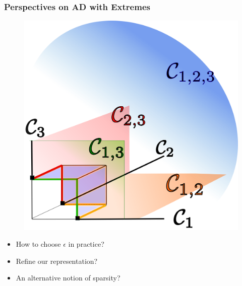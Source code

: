 \documentclass[9pt]{beamer}
\begin{document}

\begin{frame}
\frametitle{Perspectives on AD with Extremes}

  \begin{figure}
    \centering
    \includegraphics[width=0.4\linewidth]{sourcefigs/cone}
  \end{figure}


  \begin{itemize}
\item How to choose $\epsilon$ in practice?
\item Refine our representation?
\item An alternative notion of sparsity?
  \end{itemize}
\end{frame}
\end{document}
